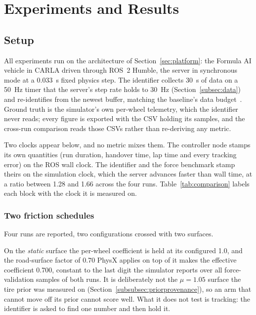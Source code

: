 \section{Experiments and Results}
\label{sec:results}

\subsection{Setup}
\label{subsec:setup}

All experiments run on the architecture of Section~\ref{sec:platform}: the
Formula AI vehicle in CARLA driven through ROS~2 Humble, the server in
synchronous mode at a \SI{0.033}{\second} fixed physics step. The identifier
collects \SI{30}{\second} of data on a \SI{50}{\hertz} timer that the server's
step rate holds to \SI{30}{\hertz} (Section~\ref{subsec:data}) and
re-identifies from the newest buffer, matching the baseline's data
budget~\cite{ontrack2025}. Ground truth is the simulator's own per-wheel
telemetry, which the identifier never reads; every figure is exported with the
CSV holding its samples, and the cross-run comparison reads those CSVs rather
than re-deriving any metric.

Two clocks appear below, and no metric mixes them. The controller node stamps
its own quantities (run duration, handover time, lap time and every tracking
error) on the ROS wall clock. The identifier and the force benchmark stamp
theirs on the simulation clock, which the server advances faster than wall time,
at a ratio between \num{1.28} and \num{1.66} across the four runs. Table~\ref{tab:comparison}
labels each block with the clock it is measured on.

\subsubsection{Two friction schedules}
\label{subsubsec:surface}
Four runs are reported, two configurations crossed with two surfaces.

On the \emph{static} surface the per-wheel coefficient is held at its configured
\num{1.0}, and the road-surface factor of \num{0.70} PhysX applies on top of it
makes the effective coefficient \num{0.700}, constant to the last digit the
simulator reports over all force-validation samples of both runs. It is
deliberately not the $\mu=\num{1.05}$ surface the tire prior was measured on
(Section~\ref{subsubsec:priorprovenance}), so an arm that cannot move off its
prior cannot score well. What it does not test is tracking: the identifier is
asked to find one number and then hold it.

